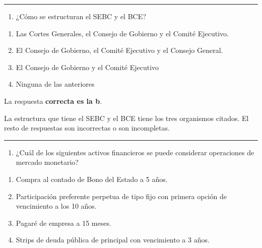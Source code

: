 \documentclass[
  letterpaper,
  DIV=11,
  numbers=noendperiod]{scrreprt}
\providecommand{\tightlist}{%
  \setlength{\itemsep}{0pt}\setlength{\parskip}{0pt}}\usepackage{longtable,booktabs,array}
\begin{document}
\begin{center}\rule{0.5\linewidth}{0.5pt}\end{center}

\begin{enumerate}
\def\labelenumi{\arabic{enumi}.}
\setcounter{enumi}{29}
\tightlist
\item
  ¿Cómo se estructuran el SEBC y el BCE?
\end{enumerate}

\begin{enumerate}
\def\labelenumi{\alph{enumi})}
\item
  Las Cortes Generales, el Consejo de Gobierno y el Comité Ejecutivo.
\item
  El Consejo de Gobierno, el Comité Ejecutivo y el Consejo General.
\item
  El Consejo de Gobierno y el Comité Ejecutivo
\item
  Ninguna de las anteriores
\end{enumerate}

\begin{tcolorbox}[enhanced jigsaw, left=2mm, opacityback=0, colback=white, breakable, arc=.35mm, bottomrule=.15mm, rightrule=.15mm, toprule=.15mm, leftrule=.75mm, colframe=quarto-callout-tip-color-frame]
\begin{minipage}[t]{5.5mm}
\textcolor{quarto-callout-tip-color}{\faLightbulb}
\end{minipage}%
\begin{minipage}[t]{\textwidth - 5.5mm}

La respuesta \textbf{correcta es la b}.

La estructura que tiene el SEBC y el BCE tiene los tres organismos
citados. El resto de respuestas son incorrectas o son incompletas.

\end{minipage}%
\end{tcolorbox}

\begin{center}\rule{0.5\linewidth}{0.5pt}\end{center}

\begin{enumerate}
\def\labelenumi{\arabic{enumi}.}
\setcounter{enumi}{30}
\tightlist
\item
  ¿Cuál de los siguientes activos financieros se puede considerar
  operaciones de mercado monetario?
\end{enumerate}

\begin{enumerate}
\def\labelenumi{\alph{enumi})}
\item
  Compra al contado de Bono del Estado a 5 años.
\item
  Participación preferente perpetua de tipo fijo con primera opción de
  vencimiento a los 10 años.
\item
  Pagaré de empresa a 15 meses.
\item
  Strips de deuda pública de principal con vencimiento a 3 años.
\end{enumerate}
\end{document}
